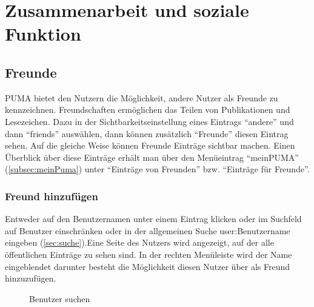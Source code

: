 \chapter{Zusammenarbeit und soziale Funktion}
\label{ch:zusammenarbeit}

\section{Freunde}%
\label{sec:freunde}
PUMA bietet den Nutzern die Möglichkeit, andere Nutzer als Freunde zu kennzeichnen. Freundschaften ermöglichen das Teilen von Publikationen und Lesezeichen. Dazu in der Sichtbarkeitseinstellung eines Eintrags \enquote{andere} und dann \enquote{friends} auswählen, dann können zusätzlich \enquote{Freunde} diesen Eintrag sehen. Auf die gleiche Weise können Freunde Einträge sichtbar machen. Einen Überblick über diese Einträge erhält man über den Menüeintrag \enquote{meinPUMA} (\autoref{subsec:meinPuma}) unter \enquote{Einträge von Freunden} bzw. \enquote{Einträge für Freunde}.\newline

\subsection{Freund hinzufügen}
\label{subsec:freundHinzu}

Entweder auf den Benutzernamen unter einem Eintrag klicken oder im Suchfeld auf Benutzer einschränken oder in der allgemeinen Suche user:Benutzername eingeben (\autoref{sec:suche}).Eine Seite des Nutzers wird angezeigt, auf der alle öffentlichen Einträge zu sehen sind. In der rechten Menüleiste wird der Name eingeblendet darunter besteht die Möglichkeit diesen Nutzer über als Freund hinzuzufügen.
    
		

		\begin{figure}[h!]
 \centering
 \caption{Benutzer suchen}
 \label{fig:benutzerSuchen}
\end{figure}

